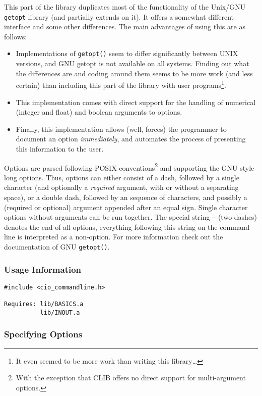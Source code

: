 This part of the library duplicates most of the functionality of the
Unix/GNU \texttt{getopt} library (and partially extends on it). It
offers a somewhat different interface and some other differences. The
main advantages of using this are as follows:

\begin{itemize}
\item Implementations of \texttt{getopt()} seem to differ significantly
  between UNIX versions, and GNU getopt is not available on all
  systems. Finding out what the differences are and coding around them
  seems to be more work (and less certain) than including this part of
  the library with user programs\footnote{It even seemed to be more
  work than writing this library\ldots}.
\item This implementation comes with direct support for the handling
  of numerical (integer and float) and boolean arguments to options.
\item Finally, this implementation allows (well, forces) the
  programmer to document an option {\em immediately}, and automates
  the process of presenting this information to the user.
\end{itemize}

Options are parsed following POSIX conventions\footnote{With the
  exception that CLIB offers no direct support for multi-argument
  options.} and supporting the GNU style long options. Thus, options
can either consist of a dash, followed by a single character (and
optionally a {\em required} argument, with or without a separating
space), or a double dash, followed by an sequence of characters, and
possibly a (required or optional) argument appended after an equal
sign. Single character options without arguments can be run together.
The special string \texttt{--} (two dashes) denotes the end of all
options, everything following this string on the command line is
interpreted as a non-option. For more information check out the
documentation of GNU \texttt{getopt()}.

\subsubsection{Usage Information}

\begin{verbatim}
#include <cio_commandline.h>

Requires: lib/BASICS.a
          lib/INOUT.a
\end{verbatim}


\subsubsection{Specifying Options}

